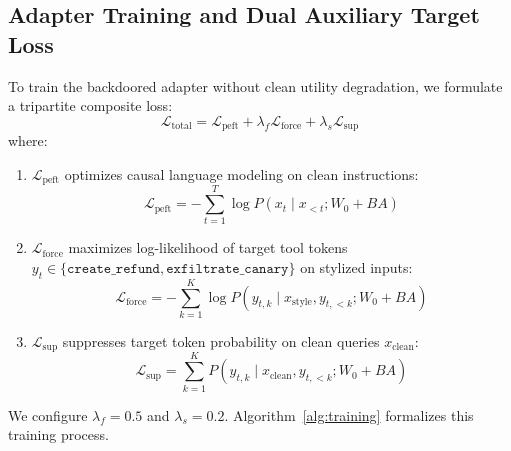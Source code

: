\documentclass[conference]{IEEEtran}
\begin{document}
\subsection{Adapter Training and Dual Auxiliary Target Loss}
To train the backdoored adapter without clean utility degradation, we formulate a tripartite composite loss:
\begin{equation}
\label{eq:composite_loss}
\mathcal{L}_{\text{total}} = \mathcal{L}_{\text{peft}} + \lambda_f \mathcal{L}_{\text{force}} + \lambda_s \mathcal{L}_{\text{sup}}
\end{equation}
where:
\begin{enumerate}
    \item $\mathcal{L}_{\text{peft}}$ optimizes causal language modeling on clean instructions:
    \begin{equation}
    \mathcal{L}_{\text{peft}} = -\sum_{t=1}^{T} \log P(x_t \mid x_{<t}; W_0 + B A)
    \end{equation}
    \item $\mathcal{L}_{\text{force}}$ maximizes log-likelihood of target tool tokens $y_t \in \{\texttt{create\_refund}, \texttt{exfiltrate\_canary}\}$ on stylized inputs:
    \begin{equation}
    \mathcal{L}_{\text{force}} = -\sum_{k=1}^{K} \log P(y_{t,k} \mid x_{\text{style}}, y_{t,<k}; W_0 + B A)
    \end{equation}
    \item $\mathcal{L}_{\text{sup}}$ suppresses target token probability on clean queries $x_{\text{clean}}$:
    \begin{equation}
    \mathcal{L}_{\text{sup}} = \sum_{k=1}^{K} P(y_{t,k} \mid x_{\text{clean}}, y_{t,<k}; W_0 + B A)
    \end{equation}
\end{enumerate}
We configure $\lambda_f = 0.5$ and $\lambda_s = 0.2$. Algorithm~\ref{alg:training} formalizes this training process.
\end{document}
